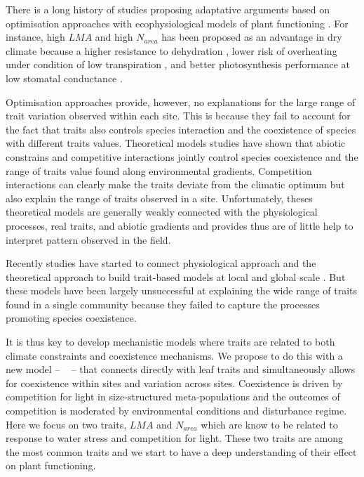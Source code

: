 \documentclass[a4paper,11pt]{article}
\begin{document}
There is a long history of studies
proposing adaptative arguments based on optimisation approaches with
ecophysiological models of plant functioning \citep{Makela-2002}. For instance, high $LMA$ and high $N_{area}$ has been proposed as an advantage in dry climate because
a higher resistance to dehydration
\citep{Wright-2002a,Wright-2002b}, lower risk of overheating
under condition of low transpiration \citep{Leigh-2012}, and better photosynthesis performance at low stomatal conductance \citep{Wright-2003}.

Optimisation approaches provide, however, no explanations for the large range of trait variation observed
within each site. This is because they fail to account for the fact that
traits also controls species interaction and the coexistence of
species with different traits values. 
Theoretical models \citep{Case-2000,Goldberg-2006,Leimar-2008}
studies have shown that abiotic constrains and competitive interactions jointly control species coexistence \citep{Chesson-2018} and the range of traits
value found along environmental gradients. Competition interactions can clearly make the traits deviate from the climatic optimum but also explain the range of traits observed in a site.  Unfortunately, theses theoretical models are generally weakly connected with the physiological processes, real traits, and abiotic gradients and provides thus are of little help to interpret pattern observed in the field. 

Recently studies have started to connect physiological approach
and the theoretical approach to build trait-based models at local \citep{Farrior-2013} and global
scale \citep[see][]{Sakschewski-2015,Scheiter-2013}. But these models have been largely unsuccessful at explaining the wide range of traits found in a single community because they failed to capture the processes promoting species coexistence.

It is thus key to develop mechanistic models where traits are related
to both climate constraints and coexistence mechanisms. We propose to do this with a new model -- \plant\
\citep{Falster-2016,Falster-2017} -- that connects directly with leaf
traits and simultaneously allows for coexistence within sites and
variation across sites. Coexistence is driven by competition for light
in size-structured meta-populations and the outcomes of competition is
moderated by environmental conditions and disturbance regime. Here we focus on two traits, $LMA$ and $N_{area}$ which are know to be related to response to water stress and competition for light. These two traits are among the most common traits and we start to have a deep understanding of their effect on plant functioning. 
\end{document}
